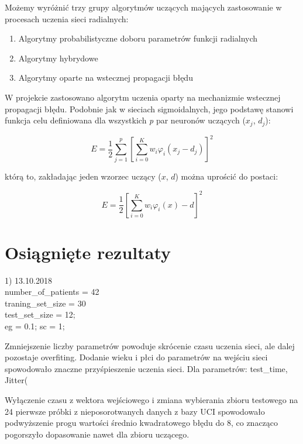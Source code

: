 \documentclass[12pt]{article}
\begin{document}
Możemy wyróżnić trzy grupy algorytmów uczących mających zastosowanie w procesach uczenia sieci radialnych:

\begin{enumerate}

\item Algorytmy probabilistyczne doboru parametrów funkcji radialnych
\item Algorytmy hybrydowe 
\item Algorytmy oparte na wstecznej propagacji błędu

\end{enumerate}

W projekcie zastosowano algorytm uczenia oparty na mechanizmie wstecznej propagacji błędu. Podobnie jak w sieciach sigmoidalnych, jego podstawę stanowi funkcja celu definiowana dla wszystkich \textsl{p} par neuronów uczących ($x_j$, $d_j$):

\[ E = \frac{1}{2} \sum_{j=1}^{p} [\sum_{i=0}^{K} w_i\varphi_{i}(x_{j} - d_j)]^2 \]

którą to, zakładając jeden wzorzec uczący ($x$, $d$) można uprościć do postaci:

\[ E = \frac{1}{2}  [\sum_{i=0}^{K} w_i\varphi_{i}(x) - d]^2 \]

\newpage
\section{Osiągnięte rezultaty}

1) 13.10.2018 \\


number\_of\_patients = 42\\
traning\_set\_size = 30\\
test\_set\_size = 12;\\

eg = 0.1; %
sc = 1;    %

Zmniejszenie liczby parametrów powoduje skrócenie czasu uczenia sieci, ale dalej pozostaje overfiting. Dodanie wieku i płci do parametrów na wejściu sieci spowodowało znaczne przyśpieszenie uczenia sieci. Dla parametrów: test\_time, Jitter(%

Wyłączenie czasu z wektora wejściowego i zmiana wybierania zbioru testowego na 24 pierwsze próbki z nieposorotwanych danych z bazy UCI spowodowało podwyższenie progu wartości średnio kwadratowego błędu do 8, co znacząco pogorszyło dopasowanie nawet dla zbioru uczącego.
\end{document}
